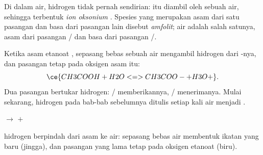 \begin{definition}\label{def:g12:ka-and-pka:oxonium}
Di dalam air,  hidrogen tidak pernah sendirian:  itu diambil oleh
sebuah  air, sehingga terbentuk \emph{ion
oksonium} . Spesies yang merupakan asam
dari satu pasangan dan basa dari pasangan lain disebut
\emph{amfolit}; air adalah salah satunya, asam dari
pasangan / dan basa dari pasangan /.
\end{definition}

\begin{example}\label{ex:g12:ka-and-pka:acid-water}
Ketika asam etanoat , sepasang  bebas sebuah  air
mengambil hidrogen dari -nya, dan pasangan  
tetap pada oksigen asam itu:
\[
  \ce{CH3COOH + H2O <=> CH3COO- + H3O+} .
\]
Dua pasangan bertukar  hidrogen: /
memberikannya, / menerimanya. Mulai sekarang, 
hidrogen pada bab-bab sebelumnya ditulis  setiap kali air
menjadi .
\end{example}

\begin{omfigure}
\qquad
{}
\qquad$\longrightarrow$\qquad
{}\quad$+$\quad{}

{\small {} hidrogen berpindah dari asam ke air: sepasang  bebas
air membentuk ikatan  yang baru (jingga), dan pasangan 
 yang lama tetap pada oksigen  etanoat (biru).}
\end{omfigure}

